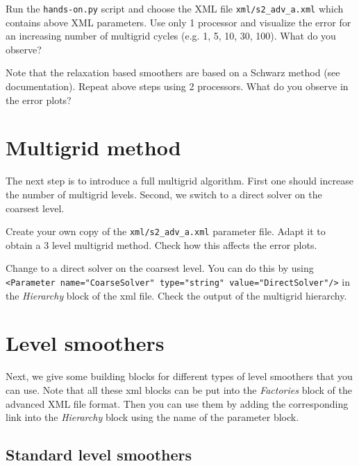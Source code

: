 \documentclass[10pt,fleqn]{book}
\begin{document}
\begin{exercise}
Run the \verb|hands-on.py| script and choose the XML file \texttt{xml/s2\_adv\_a.xml} which contains above XML parameters. Use only 1 processor and visualize the error for an increasing number of multigrid cycles (e.g. 1, 5, 10, 30, 100). What do you observe?
\end{exercise}
\begin{exercise}
Note that the relaxation based smoothers are based on a Schwarz method (see \ifpack documentation). Repeat above steps using 2 processors. What do you observe in the error plots?
\end{exercise}

\section{Multigrid method}
The next step is to introduce a full multigrid algorithm. First one should increase the number of multigrid levels. Second, we switch to a direct solver on the coarsest level.\\

\begin{exercise}
Create your own copy of the \texttt{xml/s2\_adv\_a.xml} parameter file. Adapt it to obtain a 3 level multigrid method. Check how this affects the error plots.
\end{exercise}
\begin{exercise}
Change to a direct solver on the coarsest level. You can do this by using \texttt{<Parameter name="CoarseSolver" type="string" value="DirectSolver"/>} in the \textit{Hierarchy} block of the xml file. Check the output of the multigrid hierarchy.
\end{exercise}

\section{Level smoothers}
\label{sec:advLevelSmoothers}
Next, we give some building blocks for different types of level smoothers that you can use. Note that all these xml blocks can be put into the \textit{Factories} block of the advanced \muelu XML file format. Then you can use them by adding the corresponding link into the \textit{Hierarchy} block using the name of the parameter block.

\subsection{Standard level smoothers}
\end{document}
